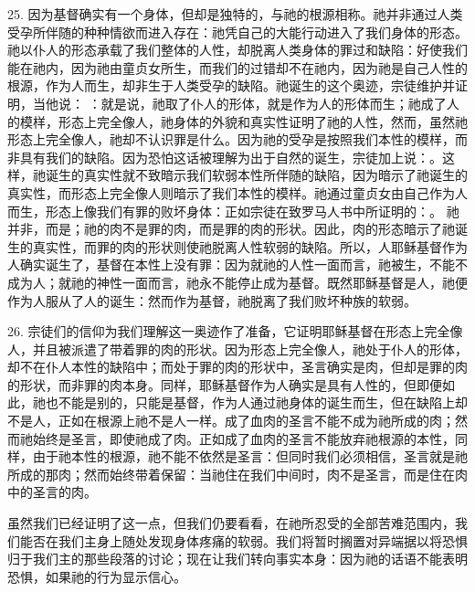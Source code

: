 25. 因为基督确实有一个身体，但却是独特的，与祂的根源相称。祂并非通过人类受孕所伴随的种种情欲而进入存在：祂凭自己的大能行动进入了我们身体的形态。祂以仆人的形态承载了我们整体的人性，却脱离人类身体的罪过和缺陷：好使我们能在祂内，因为祂由童贞女所生，而我们的过错却不在祂内，因为祂是自己人性的根源，作为人而生，却非生于人类受孕的缺陷。祂诞生的这个奥迹，宗徒维护并证明，当他说： ：就是说，祂取了仆人的形体，就是作为人的形体而生；祂成了人的模样，形态上完全像人，祂身体的外貌和真实性证明了祂的人性，然而，虽然祂形态上完全像人，祂却不认识罪是什么。因为祂的受孕是按照我们本性的模样，而非具有我们的缺陷。因为恐怕这话被理解为出于自然的诞生，宗徒加上说：。这样，祂诞生的真实性就不致暗示我们软弱本性所伴随的缺陷，因为暗示了祂诞生的真实性，而形态上完全像人则暗示了我们本性的模样。祂通过童贞女由自己作为人而生，形态上像我们有罪的败坏身体：正如宗徒在致罗马人书中所证明的：。 祂并非，而是；祂的肉不是罪的肉，而是罪的肉的形状。因此，肉的形态暗示了祂诞生的真实性，而罪的肉的形状则使祂脱离人性软弱的缺陷。所以，人耶稣基督作为人确实诞生了，基督在本性上没有罪：因为就祂的人性一面而言，祂被生，不能不成为人；就祂的神性一面而言，祂永不能停止成为基督。既然耶稣基督是人，祂便作为人服从了人的诞生：然而作为基督，祂脱离了我们败坏种族的软弱。\par

26. 宗徒们的信仰为我们理解这一奥迹作了准备，它证明耶稣基督在形态上完全像人，并且被派遣了带着罪的肉的形状。因为形态上完全像人，祂处于仆人的形体，却不在仆人本性的缺陷中；而处于罪的肉的形状中，圣言确实是肉，但却是罪的肉的形状，而非罪的肉本身。同样，耶稣基督作为人确实是具有人性的，但即便如此，祂也不能是别的，只能是基督，作为人通过祂身体的诞生而生，但在缺陷上却不是人，正如在根源上祂不是人一样。成了血肉的圣言不能不成为祂所成的肉；然而祂始终是圣言，即使祂成了肉。正如成了血肉的圣言不能放弃祂根源的本性，同样，由于祂本性的根源，祂不能不依然是圣言：但同时我们必须相信，圣言就是祂所成的那肉；然而始终带着保留：当祂住在我们中间时，肉不是圣言，而是住在肉中的圣言的肉。\par

虽然我们已经证明了这一点，但我们仍要看看，在祂所忍受的全部苦难范围内，我们能否在我们主身上随处发现身体疼痛的软弱。我们将暂时搁置对异端据以将恐惧归于我们主的那些段落的讨论；现在让我们转向事实本身：因为祂的话语不能表明恐惧，如果祂的行为显示信心。\par

